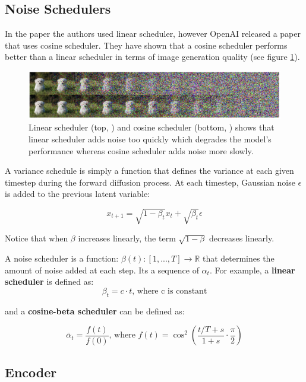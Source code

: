 



\subsection{Noise Schedulers}

In the paper \cite{ddpm} the authors used linear scheduler, however OpenAI released a paper \cite{openai_improved_ddpm} that uses cosine scheduler. They have shown that a cosine scheduler performs better than a linear scheduler in terms of image generation quality (see figure \ref{fig:linear_cosine_scheduler}).

\begin{figure}
    \centering
    \includegraphics[width=1\textwidth]{images/diffusion_models/linear_cosine_scheduler.png}
    \caption{Linear scheduler (top, \cite{ddpm}) and cosine scheduler (bottom, \cite{openai_improved_ddpm}) shows that linear scheduler adds noise too quickly which degrades the model's performance whereas cosine scheduler adds noise more slowly.}
    \label{fig:linear_cosine_scheduler}
\end{figure}

A variance schedule is simply a function that defines the variance at each given timestep during the forward diffusion process. At each timestep, Gaussian noise $\epsilon$ is added to the previous latent variable:

\[
    x_{t+1} = \sqrt{1 - \beta_t} x_t + \sqrt{\beta_t} \epsilon
\]

Notice that when $\beta$ increases linearly, the term $\sqrt{1-\beta}$ decreases linearly. 

A noise scheduler is a function: $\beta(t):[1, ..., T] \rightarrow \mathbb{R}$ that determines the amount of noise added at each step. Its a sequence of $\alpha_t$. For example, a \textbf{linear scheduler} is defined as:
\[
    \beta_t = c \cdot t \text{, where c is constant}
\]

and a \textbf{cosine-beta scheduler} can be defined as:

\[
    \bar{\alpha}_t = \frac{f(t)}{f(0)} \text{, where } f(t) = \cos^2(\frac{t/T + s}{1+s} \cdot \frac{\pi}{2})
\]


\subsection{Encoder}

